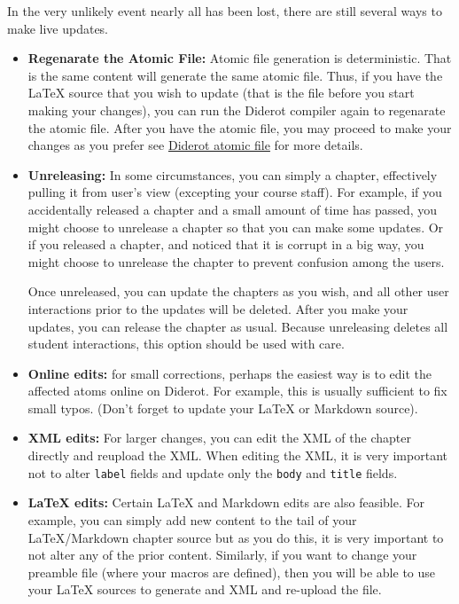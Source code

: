\begin{note}
\begin{gram}
In the very unlikely event nearly all has been lost, there are still several ways to make live updates.

\begin{itemize}
\item \textbf{Regenarate the Atomic File:} Atomic file generation is
  deterministic.  That is the same content will generate the same
  atomic file.  Thus, if you have the LaTeX source that you wish to
  update (that is the file before you start making your changes), you
  can run the Diderot compiler again to regenarate the atomic file.
  After you have the atomic file, you may proceed to make your changes
  as you prefer see
%
 \href{grm:publisg::diderot-atomic}{Diderot atomic  file} 
%
for more details.
%

\item \textbf{Unreleasing:}
In some circumstances, you can simply  a chapter, effectively pulling it from user's view (excepting your course staff).
%
For example,
if you accidentally released a chapter and a small amount of time has passed, you might choose to unrelease a chapter so that you can make some updates.
%
Or if you released a chapter, and noticed that it is corrupt in a big way, you might choose to unrelease the chapter to prevent confusion among the users.
%

Once unreleased, you can update the chapters as you wish, and all other user interactions  prior to the updates will be deleted.
%
After you make your updates, you can release the chapter as usual.
%
Because unreleasing deletes all student interactions, this option should be used with care.

\item \textbf{Online edits:}
for small corrections, perhaps the easiest way is to edit the affected atoms online on Diderot.  For example, this is usually sufficient to fix small typos.  (Don't forget to update your LaTeX or Markdown source).

\item \textbf{XML edits:}
%
For larger changes, you can edit the XML of the chapter directly and
reupload the XML.  When editing the XML, it is very important not to
alter \lstinline`label` fields and update only the \lstinline`body` and \lstinline`title` fields.

\item \textbf{LaTeX edits:}
Certain LaTeX and Markdown edits are also feasible. 
%
For example, you can simply add new content to the tail of your LaTeX/Markdown chapter source but as you do this, it is very important to not alter any of the prior content. 
%
Similarly, if you want to change your preamble file (where your macros are defined), then you will be able to use your LaTeX sources to generate and XML and re-upload the file. 


\end{itemize}
\end{gram}
\end{note}
